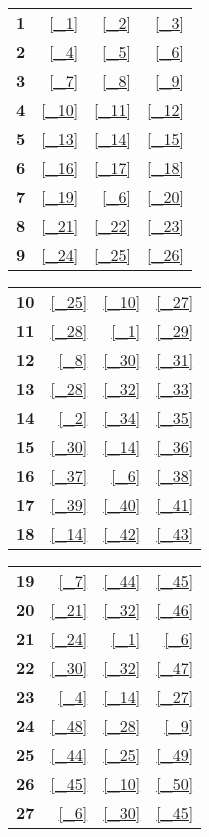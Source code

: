 \documentclass[12pt]{article}
\begin{document}
\begin{multicols}{3}

\begin{tabular}{c|rrr}
\textbf{1}  & \ref{_1} & \ref{_2} & \ref{_3} \\
\textbf{2}  & \ref{_4} & \ref{_5} & \ref{_6} \\
\textbf{3}  & \ref{_7} & \ref{_8} & \ref{_9} \\
\textbf{4}  & \ref{_10} & \ref{_11} & \ref{_12} \\
\textbf{5}  & \ref{_13} & \ref{_14} & \ref{_15} \\
\textbf{6}  & \ref{_16} & \ref{_17} & \ref{_18} \\
\textbf{7}  & \ref{_19} & \ref{_6} & \ref{_20} \\
\textbf{8}  & \ref{_21} & \ref{_22} & \ref{_23} \\
\textbf{9}  & \ref{_24} & \ref{_25} & \ref{_26} \\
\end{tabular}

\begin{tabular}{c|rrr}
\textbf{10} & \ref{_25} & \ref{_10} & \ref{_27} \\
\textbf{11} & \ref{_28} & \ref{_1} & \ref{_29} \\
\textbf{12} & \ref{_8} & \ref{_30} & \ref{_31} \\
\textbf{13} & \ref{_28} & \ref{_32} & \ref{_33} \\
\textbf{14} & \ref{_2} & \ref{_34} & \ref{_35} \\
\textbf{15} & \ref{_30} & \ref{_14} & \ref{_36} \\
\textbf{16} & \ref{_37} & \ref{_6} & \ref{_38} \\
\textbf{17} & \ref{_39} & \ref{_40} & \ref{_41} \\
\textbf{18} & \ref{_14}& \ref{_42} & \ref{_43} \\
\end{tabular}

\begin{tabular}{c|rrr}
\textbf{19} & \ref{_7} & \ref{_44} & \ref{_45} \\
\textbf{20} & \ref{_21} & \ref{_32} & \ref{_46} \\
\textbf{21} & \ref{_24} & \ref{_1} & \ref{_6} \\
\textbf{22} & \ref{_30} & \ref{_32} & \ref{_47} \\
\textbf{23} & \ref{_4} & \ref{_14} & \ref{_27} \\
\textbf{24} & \ref{_48} & \ref{_28} & \ref{_9} \\
\textbf{25} & \ref{_44} & \ref{_25} & \ref{_49} \\
\textbf{26} & \ref{_45} & \ref{_10} & \ref{_50} \\
\textbf{27} & \ref{_6} & \ref{_30} & \ref{_45} \\
\end{tabular}

\end{multicols}
\end{document}

